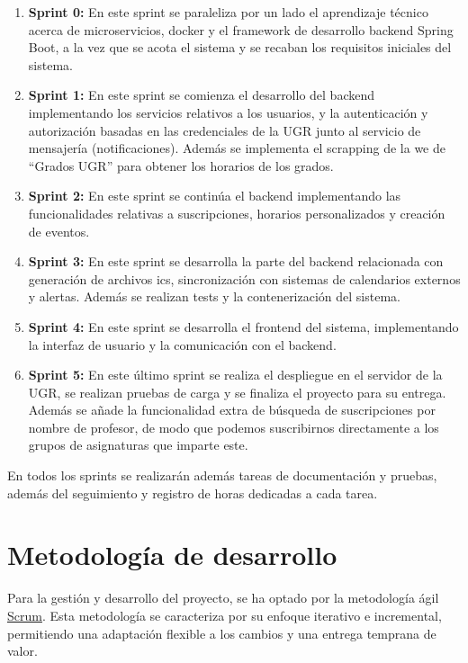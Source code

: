 \begin{enumerate}
    \item \textbf{Sprint 0:} En este sprint se paraleliza por un lado el aprendizaje técnico acerca de microservicios, docker y el framework de desarrollo backend Spring Boot, a la vez que se acota el sistema y se recaban los requisitos iniciales del sistema.
    \item \textbf{Sprint 1:} En este sprint se comienza el desarrollo del backend implementando los servicios relativos a los usuarios, y la autenticación y autorización basadas en las credenciales de la UGR junto al servicio de mensajería (notificaciones). Además se implementa el scrapping de la we de ``Grados UGR'' para obtener los horarios de los grados.
    \item \textbf{Sprint 2:} En este sprint se continúa el backend implementando las funcionalidades relativas a suscripciones, horarios personalizados y creación de eventos.
    \item \textbf{Sprint 3:} En este sprint se desarrolla la parte del backend relacionada con generación de archivos ics, sincronización con sistemas de calendarios externos y alertas. Además se realizan tests y la contenerización del sistema.
    \item \textbf{Sprint 4:} En este sprint se desarrolla el frontend del sistema, implementando la interfaz de usuario y la comunicación con el backend.
    \item \textbf{Sprint 5:} En este último sprint se realiza el despliegue en el servidor de la UGR, se realizan pruebas de carga y se finaliza el proyecto para su entrega. Además se añade la funcionalidad extra de búsqueda de suscripciones por nombre de profesor, de modo que podemos suscribirnos directamente a los grupos de asignaturas que imparte este.
\end{enumerate}

En todos los sprints se realizarán además tareas de documentación y pruebas, además del seguimiento y registro de horas dedicadas a cada tarea.

\section{Metodología de desarrollo}
Para la gestión y desarrollo del proyecto, se ha optado por la metodología ágil \hyperlink{scrum}{Scrum}. Esta metodología se caracteriza por su enfoque iterativo e incremental, permitiendo una adaptación flexible a los cambios y una entrega temprana de valor.

